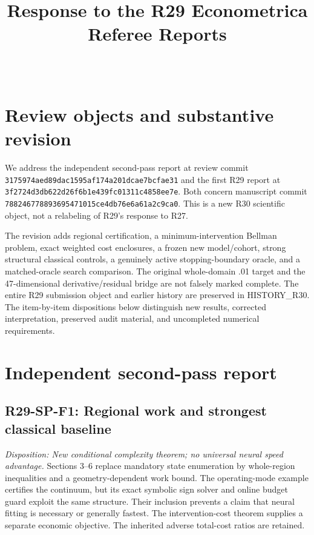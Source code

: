 

\begin{frontmatter}
\title{Response to the R29 Econometrica Referee Reports}
\begin{aug}\author[id=au1,addressref={add1}]{~}\address[id=add1]{}\end{aug}
\end{frontmatter}
\section{Review objects and substantive revision}
We address the independent second-pass report at review commit \nolinkurl{3175974aed89dac1595af174a201dcae7bcfae31} and the first R29 report at \nolinkurl{3f2724d3db622d26f6b1e439fc01311c4858ee7e}. Both concern manuscript commit \nolinkurl{788246778893695471015ce4db76e6a61a2c9ca0}. This is a new R30 scientific object, not a relabeling of R29's response to R27.

The revision adds regional certification, a minimum-intervention Bellman problem, exact weighted cost enclosures, a frozen new model/cohort, strong structural classical controls, a genuinely active stopping-boundary oracle, and a matched-oracle search comparison. The original whole-domain .01 target and the 47-dimensional derivative/residual bridge are not falsely marked complete. The entire R29 submission object and earlier history are preserved in HISTORY\_R30. The item-by-item dispositions below distinguish new results, corrected interpretation, preserved audit material, and uncompleted numerical requirements.
\section{Independent second-pass report}
\subsection{R29-SP-F1: Regional work and strongest classical baseline}
\textit{Disposition: New conditional complexity theorem; no universal neural speed advantage.} Sections 3--6 replace mandatory state enumeration by whole-region inequalities and a geometry-dependent work bound. The operating-mode example certifies the continuum, but its exact symbolic sign solver and online budget guard exploit the same structure. Their inclusion prevents a claim that neural fitting is necessary or generally fastest. The intervention-cost theorem supplies a separate economic objective. The inherited adverse total-cost ratios are retained.
